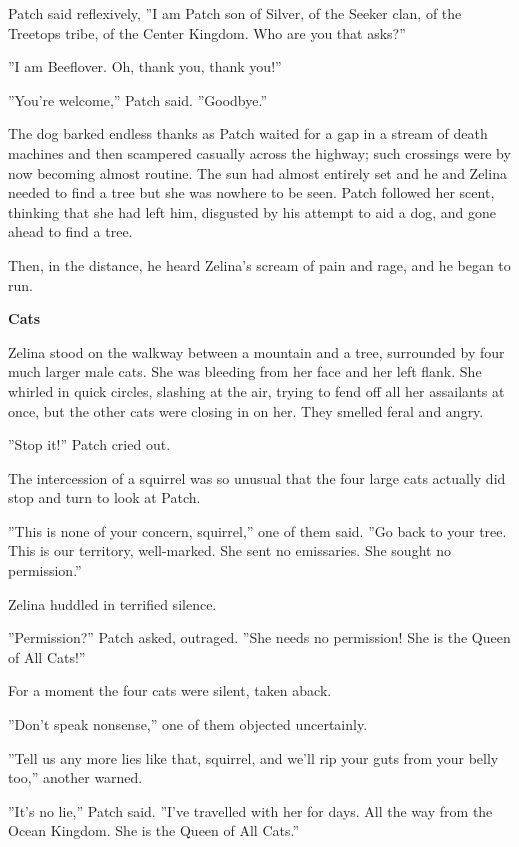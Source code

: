 \documentclass[11pt]{article}
\begin{document}
 Patch said reflexively, ''I am Patch son of Silver, of the Seeker clan, of the Treetops tribe, of the Center Kingdom. Who are you that asks?''\par
 ''I am Beeflover. Oh, thank you, thank you!''\par
 ''You're welcome,'' Patch said. ''Goodbye.''\par
 The dog barked endless thanks as Patch waited for a gap in a stream of death machines and then scampered casually across the highway; such crossings were by now becoming almost routine. The sun had almost entirely set and he and Zelina needed to find a tree %
 but she was nowhere to be seen. Patch followed her scent, thinking that she had left him, disgusted by his attempt to aid a dog, and gone ahead to find a tree.\par
 Then, in the distance, he heard Zelina's scream of pain and rage, and he began to run.\par
\par
{\bf Cats\par
}\par
 Zelina stood on the walkway between a mountain and a tree, surrounded by four much larger male cats. She was bleeding from her face and her left flank. She whirled in quick circles, slashing at the air, trying to fend off all her assailants at once, but the other cats were closing in on her. They smelled feral and angry.\par
 ''Stop it!'' Patch cried out.\par
 The intercession of a squirrel was so unusual that the four large cats actually did stop and turn to look at Patch.\par
 ''This is none of your concern, squirrel,'' one of them said. ''Go back to your tree. This is our territory, well-marked. She sent no emissaries. She sought no permission.''\par
 Zelina huddled in terrified silence.\par
 ''Permission?'' Patch asked, outraged. ''She needs no permission! She is the Queen of All Cats!''\par
 For a moment the four cats were silent, taken aback.\par
 ''Don't speak nonsense,'' one of them objected uncertainly.\par
''Tell us any more lies like that, squirrel, and we'll rip your guts from your belly too,'' another warned.\par
 ''It's no lie,'' Patch said. ''I've travelled with her for days. All the way from the Ocean Kingdom. She is the Queen of All Cats.''\par
\end{document}
